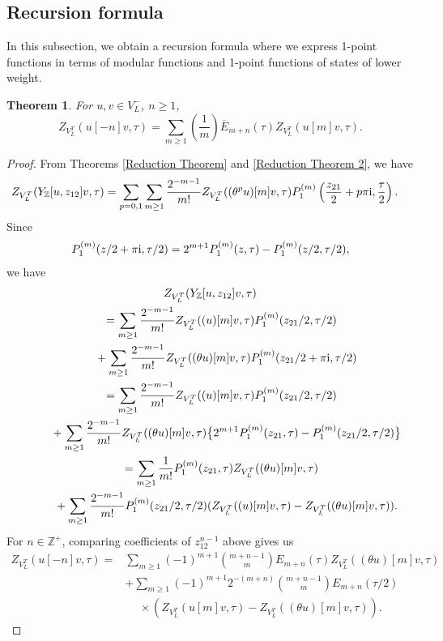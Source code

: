 \documentclass[pdftex]{sigma}
\numberwithin{equation}{section}
\newtheorem{Theorem}{Theorem}[section]
\theoremstyle{definition}
\begin{document}
\subsection{Recursion formula}\label{sec3.2}

In this subsection, we obtain a recursion formula where we express 1-point functions in terms of modular functions and 1-point functions of states of lower weight.

\begin{Theorem}\label{twisted recursion theorem}
 For $u,v\in V_L^-$, $n\geq 1$,
 \[Z_{V_L^T}(u[-n]v,\tau)=\sum_{m\geq 1}\left(\frac{1}{m}\right)\overline{E}_{m+n}(\tau)Z_{V_L^T}( u[m]v, \tau).\]
\end{Theorem}

\begin{proof}

From Theorems \ref{Reduction Theorem} and \ref{Reduction Theorem 2}, we have
\begin{align*}
Z_{V_L^T}(Y_{\mathbb{Z}}[u, z_{12}] v, \tau) &= \sum_{p=0,1} \sum_{m \geq 1} \frac{2^{-m-1}}{m!} Z_{V_L^T} ((\theta^p u)[m] v, \tau) P_1^{(m)} \left( \frac{z_{21}}{2} + p \pi {\rm i}, \frac{\tau}{2} \right).
\end{align*}
Since
\begin{gather}\label{P_1 translation}
 P_1^{(m)}(z/2+\pi {\rm i},\tau/2)=2^{m+1}P_1^{(m)}(z,\tau)-P_1^{(m)}(z/2,\tau/2),
\end{gather}
we have
\begin{gather*}
Z_{V_L^T}(Y_{\mathbb{Z}}[u,z_{12}]v,\tau)\\
\qquad=\sum_{m\geq 1}\frac{2^{-m-1}}{m!}Z_{V_L^T}((u)[m]v, \tau)P_1^{(m)}(z_{21}/2,\tau/2)\\
\phantom{\qquad=}{}+\sum_{m\geq 1}\frac{2^{-m-1}}{m!}Z_{V_L^T}((\theta u)[m]v, \tau)P_1^{(m)}(z_{21}/2+\pi {\rm i},\tau/2)\\
\qquad=\sum_{m\geq 1}\frac{2^{-m-1}}{m!}Z_{V_L^T}((u)[m]v, \tau)P_1^{(m)}(z_{21}/2,\tau/2)\\
\phantom{\qquad=}{}+\sum_{m\geq 1}\frac{2^{-m-1}}{m!}Z_{V_L^T}((\theta u)[m]v, \tau)\bigl\{ 2^{m+1}P_1^{(m)}(z_{21},\tau)-P_1^{(m)}(z_{21}/2,\tau/2) \bigr\}\\
\qquad=\sum_{m\geq 1}\frac{1}{m!} P_1^{(m)}(z_{21},\tau)Z_{V_L^T}((\theta u)[m]v, \tau)\\
\phantom{\qquad=}{}+\sum_{m\geq 1}\frac{2^{-m-1}}{m!}P_1^{(m)}(z_{21}/2,\tau/2)(Z_{V_L^T}((u)[m]v, \tau)-Z_{V_L^T}((\theta u)[m]v, \tau)).
\end{gather*}
For $n\in \mathbb{Z}^+$, comparing coefficients of $z_{12}^{n-1}$ above gives us
\begin{align*}
Z_{V_L^T}(u[-n]v,\tau)={}&\sum_{m\geq 1}(-1)^{m+1}\binom{m+n-1}{m}E_{m+n}(\tau)Z_{V_L^T}((\theta u)[m]v, \tau)\\
&+\sum_{m\geq 1}(-1)^{m+1}2^{-(m+n)}\binom{m+n-1}{m}E_{m+n}(\tau/2)\\
&\phantom{+}{}\times(Z_{V_L^T}(u[m]v, \tau)-Z_{V_L^T}((\theta u)[m]v, \tau)).\tag*{\qed}
\end{align*}\renewcommand{\qed}{}
\end{proof}
\end{document}
